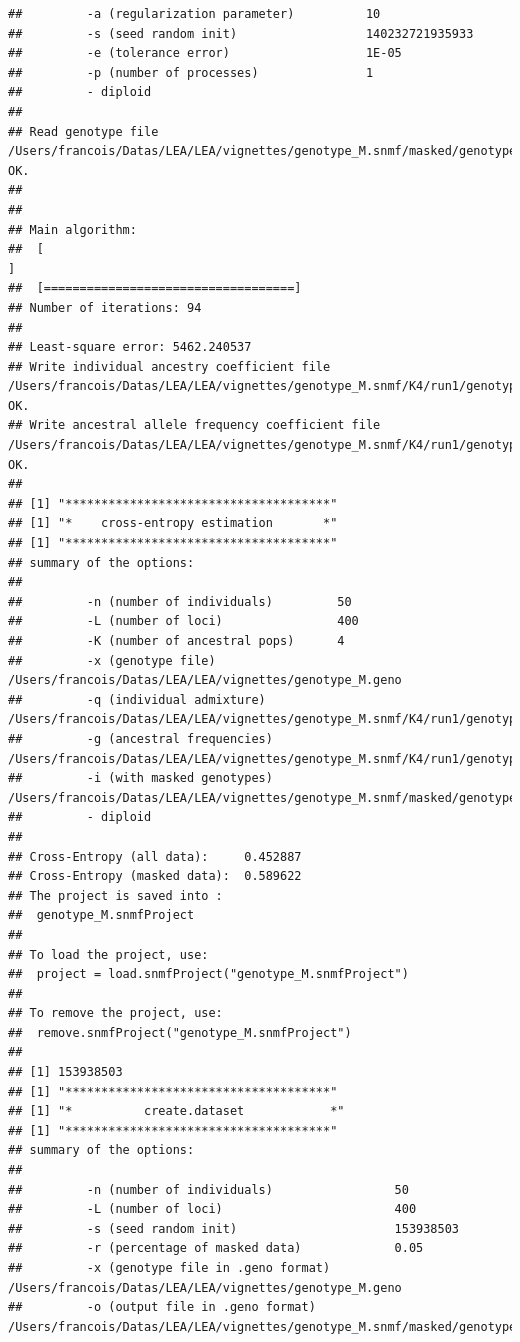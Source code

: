 \documentclass[12pt,a4paper,oneside]{article}\usepackage[]{graphicx}\usepackage[]{color}
\makeatletter
\newenvironment{kframe}{%
 \def\at@end@of@kframe{}%
 \ifinner\ifhmode%
  \def\at@end@of@kframe{\end{minipage}}%
  \begin{minipage}{\columnwidth}%
 \fi\fi%
 \def\FrameCommand##1{\hskip\@totalleftmargin \hskip-\fboxsep
 \colorbox{shadecolor}{##1}\hskip-\fboxsep
     \hskip-\linewidth \hskip-\@totalleftmargin \hskip\columnwidth}%
 \MakeFramed {\advance\hsize-\width
   \@totalleftmargin\z@ \linewidth\hsize
   \@setminipage}}%
 {\par\unskip\endMakeFramed%
 \at@end@of@kframe}
\newenvironment{knitrout}{}{} %
\makeatother
\begin{document}
\begin{knitrout}
\begin{kframe}
\begin{verbatim}
##         -a (regularization parameter)          10
##         -s (seed random init)                  140232721935933
##         -e (tolerance error)                   1E-05
##         -p (number of processes)               1
##         - diploid
## 
## Read genotype file /Users/francois/Datas/LEA/LEA/vignettes/genotype_M.snmf/masked/genotype_M_I.geno:		OK.
## 
## 
## Main algorithm:
## 	[                                                                           ]
## 	[===================================]
## Number of iterations: 94
## 
## Least-square error: 5462.240537
## Write individual ancestry coefficient file /Users/francois/Datas/LEA/LEA/vignettes/genotype_M.snmf/K4/run1/genotype_M_r1.4.Q:		OK.
## Write ancestral allele frequency coefficient file /Users/francois/Datas/LEA/LEA/vignettes/genotype_M.snmf/K4/run1/genotype_M_r1.4.G:	OK.
## 
## [1] "*************************************"
## [1] "*    cross-entropy estimation       *"
## [1] "*************************************"
## summary of the options:
## 
##         -n (number of individuals)         50
##         -L (number of loci)                400
##         -K (number of ancestral pops)      4
##         -x (genotype file)                 /Users/francois/Datas/LEA/LEA/vignettes/genotype_M.geno
##         -q (individual admixture)          /Users/francois/Datas/LEA/LEA/vignettes/genotype_M.snmf/K4/run1/genotype_M_r1.4.Q
##         -g (ancestral frequencies)         /Users/francois/Datas/LEA/LEA/vignettes/genotype_M.snmf/K4/run1/genotype_M_r1.4.G
##         -i (with masked genotypes)         /Users/francois/Datas/LEA/LEA/vignettes/genotype_M.snmf/masked/genotype_M_I.geno
##         - diploid
## 
## Cross-Entropy (all data):	 0.452887
## Cross-Entropy (masked data):	 0.589622
## The project is saved into :
##  genotype_M.snmfProject 
## 
## To load the project, use:
##  project = load.snmfProject("genotype_M.snmfProject")
## 
## To remove the project, use:
##  remove.snmfProject("genotype_M.snmfProject")
## 
## [1] 153938503
## [1] "*************************************"
## [1] "*          create.dataset            *"
## [1] "*************************************"
## summary of the options:
## 
##         -n (number of individuals)                 50
##         -L (number of loci)                        400
##         -s (seed random init)                      153938503
##         -r (percentage of masked data)             0.05
##         -x (genotype file in .geno format)         /Users/francois/Datas/LEA/LEA/vignettes/genotype_M.geno
##         -o (output file in .geno format)           /Users/francois/Datas/LEA/LEA/vignettes/genotype_M.snmf/masked/genotype_M_I.geno

\end{verbatim}
\end{kframe}
\end{knitrout}
\end{document}
